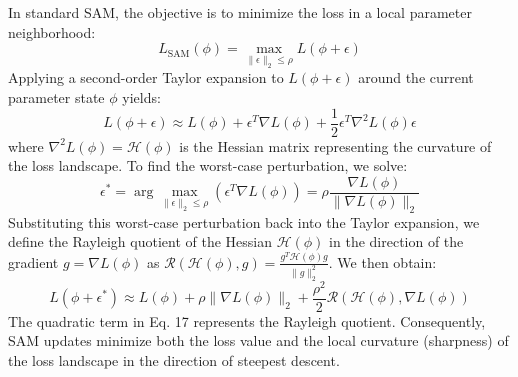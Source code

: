 \documentclass{article}
\theoremstyle{plain}
\theoremstyle{definition}
\theoremstyle{remark}
\begin{document}
In standard SAM, the objective is to minimize the loss in a local parameter neighborhood:
\begin{equation}
    L_{\text{SAM}}(\phi) = \max_{\|\epsilon\|_2 \le \rho} L(\phi + \epsilon)
\end{equation}
Applying a second-order Taylor expansion to $L(\phi + \epsilon)$ around the current parameter state $\phi$ yields:
\begin{equation}
    L(\phi + \epsilon) \approx L(\phi) + \epsilon^T \nabla L(\phi) + \frac{1}{2} \epsilon^T \nabla^2 L(\phi) \epsilon
\end{equation}
where $\nabla^2 L(\phi) = \mathcal{H}(\phi)$ is the Hessian matrix representing the curvature of the loss landscape. To find the worst-case perturbation, we solve:
\begin{equation}
    \epsilon^* = \arg\max_{\|\epsilon\|_2 \le \rho} \left( \epsilon^T \nabla L(\phi) \right) = \rho \frac{\nabla L(\phi)}{\|\nabla L(\phi)\|_2}
\end{equation}
Substituting this worst-case perturbation back into the Taylor expansion, we define the Rayleigh quotient of the Hessian $\mathcal{H}(\phi)$ in the direction of the gradient $g = \nabla L(\phi)$ as $\mathcal{R}(\mathcal{H}(\phi), g) = \frac{g^T \mathcal{H}(\phi) g}{\|g\|_2^2}$. We then obtain:
\begin{equation}
    L(\phi + \epsilon^*) \approx L(\phi) + \rho \|\nabla L(\phi)\|_2 + \frac{\rho^2}{2} \mathcal{R}(\mathcal{H}(\phi), \nabla L(\phi))
\end{equation}
The quadratic term in Eq. 17 represents the Rayleigh quotient. Consequently, SAM updates minimize both the loss value and the local curvature (sharpness) of the loss landscape in the direction of steepest descent.
\end{document}
